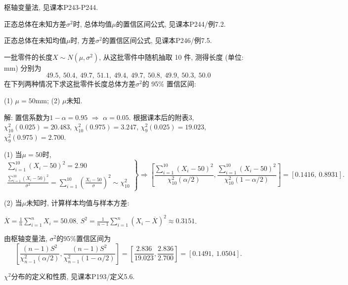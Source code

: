 \documentclass[standard]{ExBook}
\renewenvironment{shaded}{%
  \def\FrameCommand{\fboxsep=\FrameSep \colorbox{shadecolor}}%
  \MakeFramed{\advance\hsize-\width \FrameRestore}%
}{%
  \endMakeFramed
}
\begin{document}
\begin{qitems}
\textcolor{themeColor}{\selectfont {} 枢轴变量法, 见课本P243-P244.}

\textcolor{themeColor}{\selectfont {}
正态总体在未知方差$\sigma^2$时, 总体均值$\mu$的置信区间公式, 见课本P244/例7.2.}

\textcolor{themeColor}{\selectfont {}
正态总体在未知均值$\mu$时, 方差$\sigma^2$的置信区间公式, 见课本P246/例7.5.}

\vspace{2.5cm-5em}

    \begin{bbox}
    \begin{shaded}
        \qitem
一批零件的长度$X \sim N(\mu,\sigma^2)$, 从这批零件中随机抽取 10 件, 测得长度 (单位: mm) 分别为
$$49.5,\ 50.4,\ 49.7,\ 51.1,\ 49.4,\ 49.7,\ 50.8,\ 49.9,\ 50.3,\ 50.0$$
在下列两种情况下求这批零件长度总体方差$\sigma^2$的 95\% 置信区间:

(1) $\mu = 50$mm; \qquad (2) $\mu$未知.
    \end{shaded}
    \end{bbox}

\vspace{\dimexpr2.5cm-5em\relax}

解: 置信系数为$1-\alpha=0.95$ $\Longrightarrow$ $\alpha=0.05$. 根据课本后的附表3,
$\chi_{10}^2(0.025)=20.483$,
$\chi_{10}^2(0.975)=3.247$,
$\chi_9^2(0.025)=19.023$,
$\chi_9^2(0.975)=2.700$.

(1) 当$\mu=50$时,
$$
\left.
\begin{array}{r}
\displaystyle\sum_{i=1}^{10}(X_i-50)^2=2.90\\
\displaystyle\frac{\sum\limits_{i=1}^{10}(X_i-50)^2}{\sigma^2}
=\sum_{i=1}^{10}\left(\frac{X_i-50}{\sigma}\right)^2
\sim\chi_{10}^2
\end{array}
\right\}
\Longrightarrow
\left[
\frac{\sum\limits_{i=1}^{10}(X_i-50)^2}{\chi_{10}^2(\alpha/2)},
\frac{\sum\limits_{i=1}^{10}(X_i-50)^2}{\chi_{10}^2(1-\alpha/2)}
\right]
=
[0.1416,\ 0.8931].
$$

(2) 当$\mu$未知时, 计算样本均值与样本方差:

$\overline{X}=\frac{1}{n}\sum_{i=1}^nX_i=50.08$. 
$S^2=\frac{1}{n-1}\sum_{i=1}^n(X_i-\overline{X})^2\approx0.3151$.

由枢轴变量法, $\sigma^2$的95\%置信区间为
$$
\left[
\frac{(n-1)S^2}{\chi_{n-1}^2(\alpha/2)},
\frac{(n-1)S^2}{\chi_{n-1}^2(1-\alpha/2)}
\right]
=
\left[
\frac{2.836}{19.023},
\frac{2.836}{2.700}
\right]
=
[0.1491,\ 1.0504].
$$

\textcolor{themeColor}{\selectfont {} $\chi^2$分布的定义和性质, 见课本P193/定义5.6.}


\end{qitems}
\end{document}
